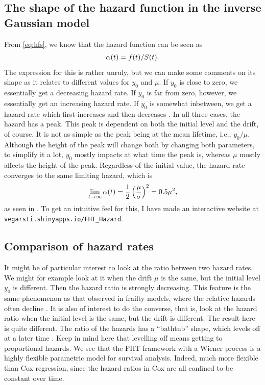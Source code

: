 \subsection{The shape of the hazard function in the inverse Gaussian model}
From \eqref{eq:hfs}, we know that the hazard function can be seen as
\begin{equation*}
    \alpha(t)=f(t)/S(t).
\end{equation*}
The expression for this is rather unruly, but we can make some comments on its shape as it relates to different values for $y_0$ and $\mu$.
If $y_0$ is close to zero, we essentially get a decreasing hazard rate.
If $y_0$ is far from zero, however, we essentially get an increasing hazard rate.
If $y_0$ is somewhat inbetween, we get a hazard rate which first increases and then decreases \citep{ABG}.
In all three cases, the hazard has a peak.
This peak is dependent on both the initial level and the drift, of course. 
It is not as simple as the peak being at the mean lifetime, i.e., $y_0/\mu$.
Although the height of the peak will change both by changing both parameters, to simplify it a lot, $y_0$ mostly impacts at what time the
peak is, whereas $\mu$ mostly affects the height of the peak.
Regardless of the initial value, the hazard rate converges to the same limiting hazard, which is
\begin{equation}
    \lim_{t\to\infty}\alpha(t)=\frac{1}{2}\left(\frac{\mu}{\sigma}\right)^2=0.5\mu^2,
\end{equation}
as seen in \citet{ABG}.
To get an intuitive feel for this, I have made an interactive website at \verb|vegarsti.shinyapps.io/FHT_Hazard|.

\subsection{Comparison of hazard rates}
It might be of particular interest to look at the ratio between two hazard rates. We might for example look at it when the drift $\mu$ is the same, but the initial level $y_0$ is different. Then the hazard ratio is strongly decreasing. This feature is the same phenomenon as that observed in frailty models, where the relative hazards often decline \citep{ABG}.
It is also of interest to do the converse, that is, look at the hazard ratio when the initial level is the same, but the drift is different. The result here is quite different. The ratio of the hazards has a ``bathtub'' shape, which levels off at a later time \citep{ABG}. Keep in mind here that levelling off means getting to proportional hazards.
We see that the FHT framework with a Wiener process is a highly flexible parametric model for survival analysis. Indeed, much more flexible than Cox regression, since the hazard ratios in Cox are all confined to be constant over time.

